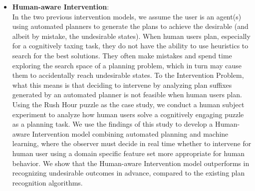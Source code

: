 \begin{itemize}
\item \textbf{Human-aware Intervention}:\\
In the two previous intervention models, we assume the user is an agent(s) using automated planners to generate the plans to achieve the desirable (and albeit by mistake, the undesirable states).
When human users plan, especially for a cognitively taxing task, they do not have the ability to use heuristics to search for the best solutions.
They often make mistakes and spend time exploring the search space of a planning problem, which in turn may cause them to accidentally reach undesirable states.
To the Intervention Problem, what this means is that deciding to intervene by analyzing plan suffixes generated by an automated planner is not feasible when human users plan.
Using the Rush Hour puzzle as the case study, we conduct a human subject experiment to analyze how human users solve a cognitively engaging puzzle as a planning task.
We use the findings of this study to develop a Human-aware Intervention model combining automated planning and machine learning, where the observer must decide in real time whether to intervene for human user using a domain specific feature set more appropriate for human behavior.
We show that the Human-aware Intervention model outperforms in recognizing undesirable outcomes in advance, compared to the existing plan recognition algorithms.
\end{itemize}

